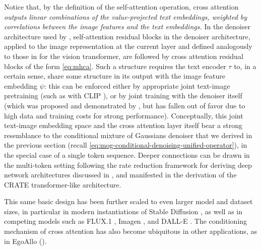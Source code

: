 \documentclass[../../book-main.tex]{subfiles}
\begin{document}
Notice that, by the definition of the self-attention operation, cross attention
\textit{outputs linear combinations of the value-projected text embeddings,
weighted by correlations between the image features and the text embeddings.}
In the denoiser architecture used by \textcite{rombach2022high}, 
self-attention residual blocks in the denoiser architecture, applied to the
image representation at the current layer and defined analogously
to those in  for the vision transformer, are followed by cross
attention residual blocks of the form \eqref{eq:mhca}.
Such a structure requires the text encoder $\tau$ to, in a certain sense, share some
structure in its output with the image feature embedding $\psi$: this can be
enforced either by appropriate joint text-image pretraining (such as with CLIP
\cite{Radford2021-ir}), or by joint training with
the denoiser itself (which was proposed and demonstrated by
\textcite{rombach2022high}, but has fallen out of favor due to high data and
training costs for strong performance).
Conceptually, this joint text-image embedding space and the cross attention
layer itself bear a strong resemblance to the
conditional mixture of Gaussians denoiser that we derived in the previous
section (recall \eqref{eq:mog-conditional-denoising-unified-operator}), in the
special case of a single token sequence. Deeper
connections can be drawn in the multi-token setting following the rate reduction
framework for deriving deep network architectures discussed in
, and manifested in the derivation of the CRATE
transformer-like architecture.

This same basic design has been further scaled to even larger model and dataset
sizes, in particular in modern instantiations of Stable Diffusion
\cite{DBLP:conf/icml/EsserKBEMSLLSBP24}, as well as in competing models such as
FLUX.1 \cite{Labs2025-fb}, Imagen \cite{Saharia2022-na}, and DALL-E \cite{Ramesh2022-nu}.
The conditioning mechanism of cross attention has also become ubiquitous in
other applications, as in EgoAllo ().


%
\end{document}

